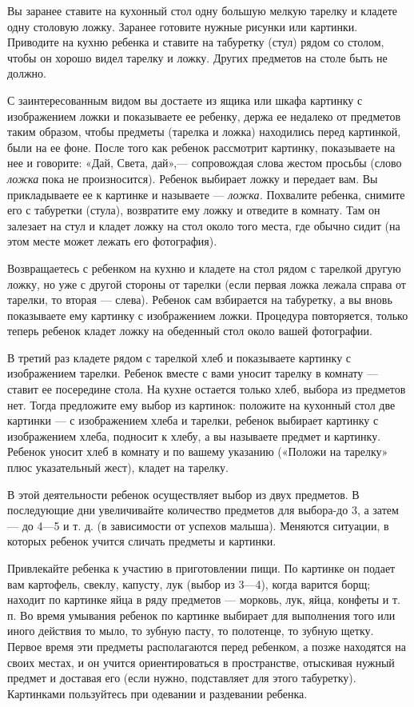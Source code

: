 \documentclass{book}
\renewcommand{\emph}[1]{\textit{#1}}
\begin{document}
Вы заранее ставите на кухонный стол одну большую мелкую тарелку и
кладете одну столовую ложку. Заранее готовите нужные рисунки или
картинки. Приводите на кухню ребенка и ставите на табуретку (стул) рядом
со столом, чтобы он хорошо видел тарелку и ложку. Других предметов на
столе быть не должно.

С заинтересованным видом вы достаете из ящика или шкафа картинку с
изображением ложки и показываете ее ребенку, держа ее недалеко от
предметов таким образом, чтобы предметы (тарелка и ложка) находились
перед картинкой, были на ее фоне. После того как ребенок рассмотрит
картинку, показываете на нее и говорите: «Дай, Света, дай»,---
сопровождая слова жестом просьбы (слово \emph{ложка} пока не
произносится). Ребенок выбирает ложку и передает вам. Вы прикладываете
ее к картинке и называете --- \emph{ложка.} Похвалите ребенка, снимите
его с табуретки (стула), возвратите ему ложку и отведите в комнату. Там
он залезает на стул и кладет ложку на стол около того места, где обычно
сидит (на этом месте может лежать его фотография).

Возвращаетесь с ребенком на кухню и кладете на стол рядом с тарелкой
другую ложку, но уже с другой стороны от тарелки (если первая ложка
лежала справа от тарелки, то вторая --- слева). Ребенок сам взбирается
на табуретку, а вы вновь показываете ему картинку с изображением ложки.
Процедура повторяется, только теперь ребенок кладет ложку на обеденный
стол около вашей фотографии.

В третий раз кладете рядом с тарелкой хлеб и показываете картинку с
изображением тарелки. Ребенок вместе с вами уносит тарелку в комнату ---
ставит ее посередине стола. На кухне остается только хлеб, выбора из
предметов нет. Тогда предложите ему выбор из картинок: положите на
кухонный стол две картинки --- с изображением хлеба и тарелки, ребенок
выбирает картинку с изображением хлеба, подносит к хлебу, а вы называете
предмет и картинку. Ребенок уносит хлеб в комнату и по вашему указанию
(«Положи на тарелку» плюс указательный жест), кладет на тарелку.

В этой деятельности ребенок осуществляет выбор из двух предметов. В
последующие дни увеличивайте количество предметов для выбора-до 3, а
затем --- до 4---5 и т. д. (в зависимости от успехов малыша). Меняются
ситуации, в которых ребенок учится сличать предметы и картинки.

Привлекайте ребенка к участию в приготовлении пищи. По картинке он
подает вам картофель, свеклу, капусту, лук (выбор из 3---4), когда
варится борщ; находит по картинке яйца в ряду предметов --- морковь,
лук, яйца, конфеты и т. п. Во время умывания ребенок по картинке
выбирает для выполнения того или иного действия то мыло, то зубную
пасту, то полотенце, то зубную щетку. Первое время эти предметы
располагаются перед ребенком, а позже находятся на своих местах, и он
учится ориентироваться в пространстве, отыскивая нужный предмет и
доставая его (если нужно, подставляет для этого табуретку). Картинками
пользуйтесь при одевании и раздевании ребенка.
\end{document}

